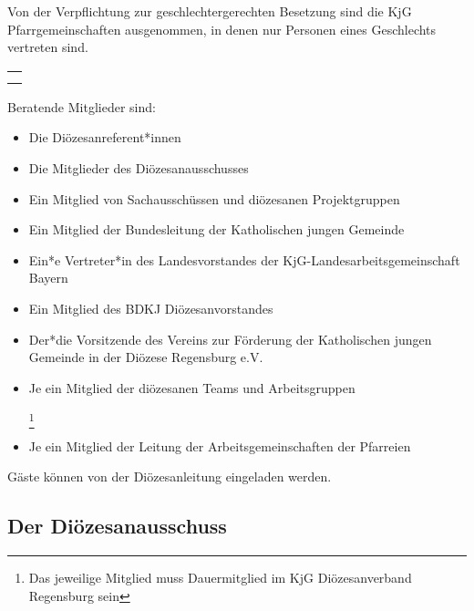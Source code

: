 \documentclass[12pt]{report}
\newcommand{\footnoteremember}[2]{
  \footnote{#2}
  \newcounter{#1}
  \setcounter{#1}{\value{footnote}}
}
\newcommand{\footnoterecall}[1]{%
  \footnotemark[\value{#1}]
}
\begin{document}
\begin{flushleft}
{\color{red}Von der Verpflichtung zur geschlechtergerechten Besetzung sind die KjG Pfarrgemeinschaften ausgenommen,
in denen nur Personen eines Geschlechts vertreten sind.}

\begin{table}[H]
 \begin{tabular}{|l|}
  \hline
  \rowcolor[HTML]{9AFF99} 
  \rule[-1ex]{0pt}{4ex}
  \begin{minipage}[t]{\textwidth}
   \textbf{Ende\\}  
    \end{minipage}
  \\ \hline
 \end{tabular}
\end{table}

Beratende Mitglieder sind:
\begin{itemize}
  \item Die Diözesanreferent*innen
  \item Die Mitglieder des Diözesanausschusses
  \item Ein Mitglied von Sachausschüssen und diözesanen Projektgruppen
  \item Ein Mitglied der Bundesleitung der Katholischen jungen Gemeinde
  \item Ein*e Vertreter*in des Landesvorstandes der KjG-Landesarbeitsgemeinschaft Bayern
  \item Ein Mitglied des BDKJ Diözesanvorstandes
  \item Der*die Vorsitzende des Vereins zur Förderung der Katholischen jungen Gemeinde in der
        Diözese Regensburg e.V.
  \item Je ein Mitglied der diözesanen Teams und Arbeitsgruppen
        \footnoteremember{Dauermitglied}{Das jeweilige Mitglied muss Dauermitglied im KjG Diözesanverband Regensburg sein}
  \item Je ein Mitglied der Leitung der Arbeitsgemeinschaften der Pfarreien \footnoterecall{Dauermitglied}
\end{itemize}

Gäste können von der Diözesanleitung eingeladen werden.

\subsection{Der Diözesanausschuss}

\end{flushleft}
\end{document}
